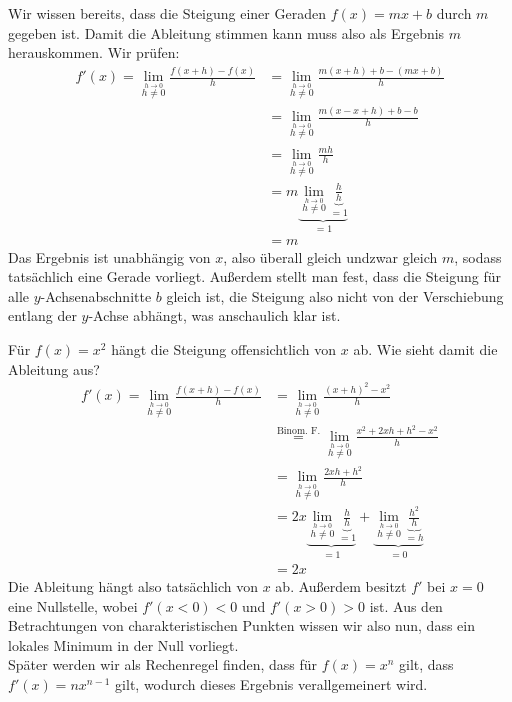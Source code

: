\documentclass[../../main.tex]{subfiles}
\begin{document}
    \begin{example}{}
        Wir wissen bereits, dass die Steigung einer Geraden $f(x) = mx + b$ durch $m$ gegeben ist. Damit die Ableitung stimmen kann muss also als Ergebnis $m$ herauskommen. Wir prüfen:
        \begin{align*}
        f'(x) = \lim\limits_{\stackrel{h\to 0}{h\neq 0}}\frac{f(x+h)-f(x)}{h} &= \lim\limits_{\stackrel{h\to 0}{h\neq 0}}\frac{m(x+h)+b-(mx+b)}{h}\\
        &= \lim\limits_{\stackrel{h\to 0}{h\neq 0}}\frac{m(x-x+h)+b-b}{h}\\
        &= \lim\limits_{\stackrel{h\to 0}{h\neq 0}}\frac{mh}{h}\\
        &= m\underbrace{\lim\limits_{\stackrel{h\to 0}{h\neq 0}}\underbrace{\frac{h}{h}}_{=1}}_{=1}\\
        &= m
        \end{align*}
        Das Ergebnis ist unabhängig von $x$, also überall gleich undzwar gleich $m$, sodass tatsächlich eine Gerade vorliegt. Außerdem stellt man fest, dass die Steigung für alle $y$-Achsenabschnitte $b$ gleich ist, die Steigung also nicht von der Verschiebung entlang der $y$-Achse abhängt, was anschaulich klar ist.
    \end{example}
    \begin{example}{}
        Für $f(x) = x^2$ hängt die Steigung offensichtlich von $x$ ab. Wie sieht damit die Ableitung aus?
        \begin{align*}
        f'(x) = \lim\limits_{\stackrel{h\to 0}{h\neq 0}}\frac{f(x+h)-f(x)}{h} &= \lim\limits_{\stackrel{h\to 0}{h\neq 0}}\frac{(x+h)^2-x^2}{h}\\
        &\stackrel{\text{Binom. F.}}{=} \lim\limits_{\stackrel{h\to 0}{h\neq 0}}\frac{x^2+2xh+h^2-x^2}{h}\\
        &= \lim\limits_{\stackrel{h\to 0}{h\neq 0}}\frac{2xh + h^2}{h}\\
        &= 2x\underbrace{\lim\limits_{\stackrel{h\to 0}{h\neq 0}}\underbrace{\frac{h}{h}}_{=1}}_{=1} + \underbrace{\lim\limits_{\stackrel{h\to 0}{h\neq 0}}\underbrace{\frac{h^2}{h}}_{=h}}_{=0}\\
        &= 2x
        \end{align*}
        Die Ableitung hängt also tatsächlich von $x$ ab. Außerdem besitzt $f'$ bei $x=0$ eine Nullstelle, wobei $f'(x<0)<0$ und $f'(x>0)>0$ ist. Aus den Betrachtungen von charakteristischen Punkten wissen wir also nun, dass ein lokales Minimum in der Null vorliegt.\\ Später werden wir als Rechenregel finden, dass für $f(x) = x^n$ gilt, dass $f'(x) = nx^{n-1}$ gilt, wodurch dieses Ergebnis verallgemeinert wird.
    \end{example}
\end{document}
